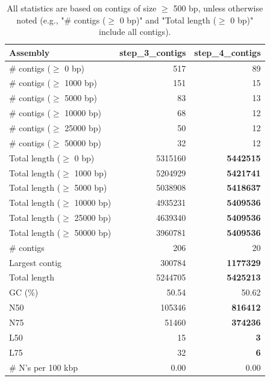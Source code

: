 \documentclass[12pt,a4paper]{article}
\begin{document}
\begin{table}[ht]
\begin{center}
\caption{All statistics are based on contigs of size $\geq$ 500 bp, unless otherwise noted (e.g., "\# contigs ($\geq$ 0 bp)" and "Total length ($\geq$ 0 bp)" include all contigs).}
\begin{tabular}{|l*{2}{|r}|}
\hline
Assembly & step\_3\_contigs & step\_4\_contigs \\ \hline
\# contigs ($\geq$ 0 bp) & 517 & 89 \\ \hline
\# contigs ($\geq$ 1000 bp) & 151 & 15 \\ \hline
\# contigs ($\geq$ 5000 bp) & 83 & 13 \\ \hline
\# contigs ($\geq$ 10000 bp) & 68 & 12 \\ \hline
\# contigs ($\geq$ 25000 bp) & 50 & 12 \\ \hline
\# contigs ($\geq$ 50000 bp) & 32 & 12 \\ \hline
Total length ($\geq$ 0 bp) & 5315160 & {\bf 5442515} \\ \hline
Total length ($\geq$ 1000 bp) & 5204929 & {\bf 5421741} \\ \hline
Total length ($\geq$ 5000 bp) & 5038908 & {\bf 5418637} \\ \hline
Total length ($\geq$ 10000 bp) & 4935231 & {\bf 5409536} \\ \hline
Total length ($\geq$ 25000 bp) & 4639340 & {\bf 5409536} \\ \hline
Total length ($\geq$ 50000 bp) & 3960781 & {\bf 5409536} \\ \hline
\# contigs & 206 & 20 \\ \hline
Largest contig & 300784 & {\bf 1177329} \\ \hline
Total length & 5244705 & {\bf 5425213} \\ \hline
GC (\%) & 50.54 & 50.62 \\ \hline
N50 & 105346 & {\bf 816412} \\ \hline
N75 & 51460 & {\bf 374236} \\ \hline
L50 & 15 & {\bf 3} \\ \hline
L75 & 32 & {\bf 6} \\ \hline
\# N's per 100 kbp & 0.00 & 0.00 \\ \hline
\end{tabular}
\end{center}
\end{table}
\end{document}

